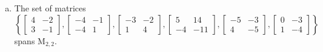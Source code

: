 \begin{exerciseAnswer}
\begin{enumerate}[(a)]
\item The set of matrices \( \left\{ \left[\begin{array}{cc}
4 & -2 \\
3 & -1
\end{array}\right] , \left[\begin{array}{cc}
-4 & -1 \\
-4 & 1
\end{array}\right] , \left[\begin{array}{cc}
-3 & -2 \\
1 & 4
\end{array}\right] , \left[\begin{array}{cc}
5 & 14 \\
-4 & -11
\end{array}\right] , \left[\begin{array}{cc}
-5 & -3 \\
4 & -5
\end{array}\right] , \left[\begin{array}{cc}
0 & -3 \\
1 & -4
\end{array}\right] \right\} \) spans \(\mathrm{M}_{2,2}\). 
\end{enumerate}
    
\end{exerciseAnswer}
    
